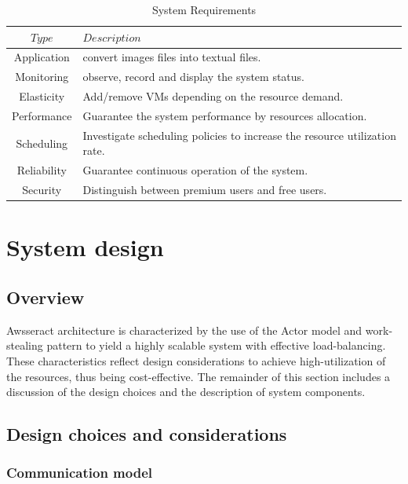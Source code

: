 \documentclass[conference]{IEEEtran}
\begin{document}
\begin{table}[H]
\renewcommand{\arraystretch}{1.3}
\caption{System Requirements}\label{tab:sysreq}
\centering
\begin{tabular*}{8cm}{c|p{5cm}}
    \hline
    $Type$&$Description$\\
    \hline
    Application&convert images files into textual files.\\
    Monitoring&observe, record and display the system status.\\
    Elasticity&Add/remove VMs depending on the resource demand.\\
    Performance&Guarantee the system performance by resources allocation.\\
    Scheduling&Investigate scheduling policies to increase the resource utilization rate.\\
    Reliability&Guarantee continuous operation of the system.\\
    Security&Distinguish between premium users and free users.\\
    \hline
\end{tabular*}
\end{table}

\section{System design}\label{sec:sysdesign}

\subsection{Overview}
\noindent
Awsseract architecture is characterized by the use of the Actor model and work-stealing pattern to yield a highly scalable system with effective load-balancing. These characteristics reflect design considerations to achieve high-utilization of the resources, thus being cost-effective. The remainder of this section includes a discussion of the design choices and the description of system components.   



\subsection{Design choices and considerations}\label{sec:sysdesign_choices}

\subsubsection{Communication model}\label{sec:sysdesign_com}
\end{document}
